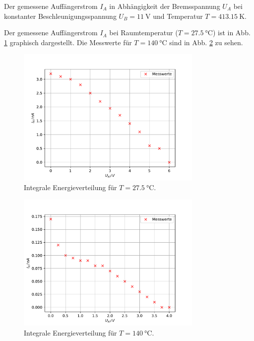 \begin{table}
    \centering
    \caption{Der gemessene Auffängerstrom $I_A$ in Abhängigkeit der Bremsspannung $U_A$ bei konstanter Beschleunigungsspannung $U_B = \SI{11}{\volt}$ und Temperatur $T = \SI{413.15}{\kelvin}$.}
    \label{tab:messwerte_140}  
\end{table}
\FloatBarrier
Der gemessene Auffängerstrom $I_A$ bei Raumtemperatur ($T = \SI{27.5}{\degreeCelsius}$) ist in Abb. \ref{fig:raumtemperatur_int} graphisch dargestellt.
Die Messwerte für $T = \SI{140}{\degreeCelsius}$ sind in Abb. \ref{fig:140_int} zu sehen.

\begin{figure}
    \centering
    \includegraphics[width=0.8\textwidth]{content/data/raumtemperatur_int.pdf}
    \caption{Integrale Energieverteilung für $T=\SI{27.5}{\degreeCelsius}$. \cite{matplotlib}\cite{numpy}}
    \label{fig:raumtemperatur_int}
\end{figure}

\begin{figure}
    \centering
    \includegraphics[width=0.8\textwidth]{content/data/140_int.pdf}
    \caption{Integrale Energieverteilung für $T=\SI{140}{\degreeCelsius}$. \cite{matplotlib}\cite{numpy}}
    \label{fig:140_int}
\end{figure}

